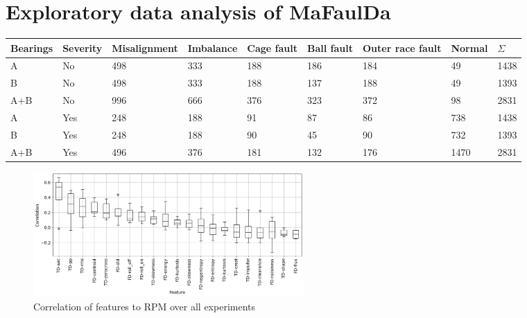 \section{Exploratory data analysis of MaFaulDa}
\begin{table}[h]
\centering
\begin{tabular}{|l|l|l|l|l|l|l|l|l|}
\hline
\textbf{Bearings} & \textbf{Severity} & \textbf{Misalignment} & \textbf{Imbalance} & \textbf{Cage fault} & \textbf{Ball fault} & \textbf{Outer race fault} & \textbf{Normal} & \textbf{$\Sigma$} \\ \hline
A                 & No                & 498                   & 333                & 188                 & 186                 & 184                       & 49              & 1438              \\ \hline
B                 & No                & 498                   & 333                & 188                 & 137                 & 188                       & 49              & 1393              \\ \hline
A+B               & No                & 996                   & 666                & 376                 & 323                 & 372                       & 98              & 2831              \\ \hline
A                 & Yes               & 248                   & 188                & 91                  & 87                  & 86                        & 738             & 1438              \\ \hline
B                 & Yes               & 248                   & 188                & 90                  & 45                  & 90                        & 732             & 1393              \\ \hline
A+B               & Yes               & 496                   & 376                & 181                 & 132                 & 176                       & 1470            & 2831              \\ \hline
\end{tabular}
\end{table}

\begin{figure}[h]
    \centering
    \includegraphics[width=0.5\textwidth]{assets/results/feature-values/corr-to-rpm.png}
    \caption{Correlation of features to RPM over all experiments}
\end{figure}


